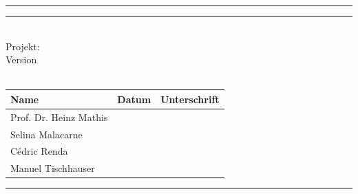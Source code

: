 
\hrule
{}
\hrule
\begin{center}
   	\begin{flushright}
   		\Huge
   		\titleinfo\\
   		\Large
   		Projekt: \subjectinfo\\
   		\large
   		Version \versioninfo\\
   		\authorinfo \\			
   	\end{flushright}
   	\renewcommand\arraystretch{1.5}
   	\begin{tabularx}{\linewidth}{|X|X|X|}
   		\hline
   		\textbf{Name} & \textbf{Datum} & \textbf{Unterschrift}\\
   		\hline
   		Prof. Dr. Heinz Mathis & & \\
   		\hline
   		Selina Malacarne& & \\
   		\hline
   		Cédric Renda& & \\
   		\hline
   		Manuel Tischhauser& & \\
        \hline
   	\end{tabularx}
\end{center}
\cfoot{}
\hrule
{
    \footnotesize 
    \begin{flushright}
        \dateinfo
    \end{flushright}
}

\restoregeometry
